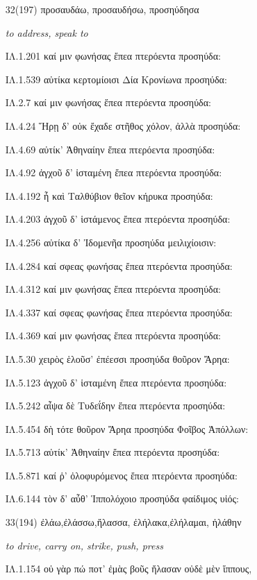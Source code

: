 \begin{enumerate}
\clearpage
\item[\large 32(197)]{\large \g προσαυδάω, προσαυδήσω, προσηύδησα} 

\hspace{0.2cm} \textit{ to address, speak to  }

{\g
ΙΛ.1.201 καί μιν φωνήσας ἔπεα πτερόεντα προσηύδα:

ΙΛ.1.539 αὐτίκα κερτομίοισι Δία Κρονίωνα προσηύδα:

ΙΛ.2.7 καί μιν φωνήσας ἔπεα πτερόεντα προσηύδα:

ΙΛ.4.24 Ἥρῃ δ' οὐκ ἔχαδε στῆθος χόλον, ἀλλὰ προσηύδα:

ΙΛ.4.69 αὐτίκ' Ἀθηναίην ἔπεα πτερόεντα προσηύδα:

ΙΛ.4.92 ἀγχοῦ δ' ἱσταμένη ἔπεα πτερόεντα προσηύδα:

ΙΛ.4.192 ἦ καὶ Ταλθύβιον θεῖον κήρυκα προσηύδα:

ΙΛ.4.203 ἀγχοῦ δ' ἱστάμενος ἔπεα πτερόεντα προσηύδα:

ΙΛ.4.256 αὐτίκα δ' Ἰδομενῆα προσηύδα μειλιχίοισιν:

ΙΛ.4.284 καί σφεας φωνήσας ἔπεα πτερόεντα προσηύδα:

ΙΛ.4.312 καί μιν φωνήσας ἔπεα πτερόεντα προσηύδα:

ΙΛ.4.337 καί σφεας φωνήσας ἔπεα πτερόεντα προσηύδα:

ΙΛ.4.369 καί μιν φωνήσας ἔπεα πτερόεντα προσηύδα:

ΙΛ.5.30 χειρὸς ἑλοῦσ' ἐπέεσσι προσηύδα θοῦρον Ἄρηα:

ΙΛ.5.123 ἀγχοῦ δ' ἱσταμένη ἔπεα πτερόεντα προσηύδα:

ΙΛ.5.242 αἶψα δὲ Τυδεΐδην ἔπεα πτερόεντα προσηύδα:

ΙΛ.5.454 δὴ τότε θοῦρον Ἄρηα προσηύδα Φοῖβος Ἀπόλλων:

ΙΛ.5.713 αὐτίκ' Ἀθηναίην ἔπεα πτερόεντα προσηύδα:

ΙΛ.5.871 καί ῥ' ὀλοφυρόμενος ἔπεα πτερόεντα προσηύδα:

ΙΛ.6.144 τὸν δ' αὖθ' Ἱππολόχοιο προσηύδα φαίδιμος υἱός:

}

\clearpage
\item[\large 33(194)]{\large \g ἐλάω,ἐλάσσω,ἤλασσα, ἐλήλακα,ἐλήλαμαι, ἠλάθην}

\hspace{0.2cm} \textit{ to drive, carry on, strike, push, press  }

{\g
ΙΛ.1.154 οὐ γὰρ πώ ποτ' ἐμὰς βοῦς ἤλασαν οὐδὲ μὲν ἵππους,

}
\end{enumerate}
